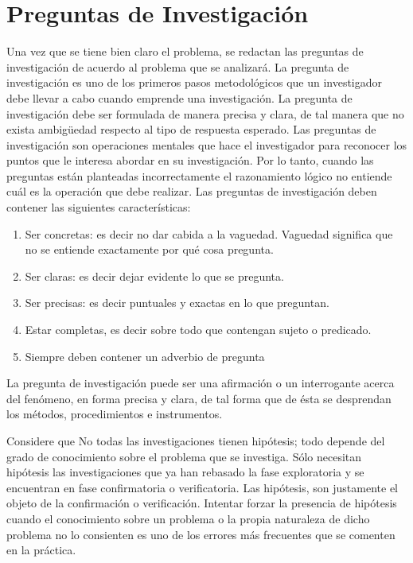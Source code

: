 \documentclass{informe_investigacion}
\begin{document}
\section{Preguntas de Investigación}
Una vez que se tiene bien claro el problema, se redactan las preguntas de investigación de acuerdo al problema que se analizará. La pregunta de investigación es uno de los primeros pasos metodológicos que un investigador debe llevar a cabo cuando emprende una investigación. La pregunta de investigación debe ser formulada de manera precisa y clara, de tal manera que no exista ambigüedad respecto al tipo de respuesta esperado.
Las preguntas de investigación son operaciones mentales que hace el investigador para reconocer los puntos que le interesa abordar en su investigación. Por lo tanto, cuando las preguntas están planteadas incorrectamente el razonamiento lógico no entiende cuál es la operación que debe realizar. Las preguntas de investigación deben contener las siguientes características:
\begin{enumerate}
    \item Ser concretas: es decir no dar cabida a la vaguedad. Vaguedad significa que no se entiende exactamente por qué cosa pregunta.
    \item Ser claras: es decir dejar evidente lo que se pregunta.
    \item Ser precisas: es decir puntuales y exactas en lo que preguntan.
    \item Estar completas, es decir sobre todo que contengan sujeto o predicado.
    \item Siempre deben contener un adverbio de pregunta
\end{enumerate}

La pregunta de investigación puede ser una afirmación o un interrogante acerca del fenómeno, en forma precisa y clara, de tal forma que de ésta se desprendan los métodos, procedimientos e instrumentos.

Considere que No todas las investigaciones tienen hipótesis; todo depende del grado de conocimiento sobre el problema que se investiga. Sólo necesitan hipótesis las investigaciones que ya han rebasado la fase exploratoria y se encuentran en fase confirmatoria o verificatoria. Las hipótesis, son justamente el objeto de la confirmación o verificación. Intentar forzar la presencia de hipótesis cuando el conocimiento sobre un problema o la propia naturaleza de dicho problema no lo consienten es uno de los errores más frecuentes que se comenten en la práctica.
\end{document}
